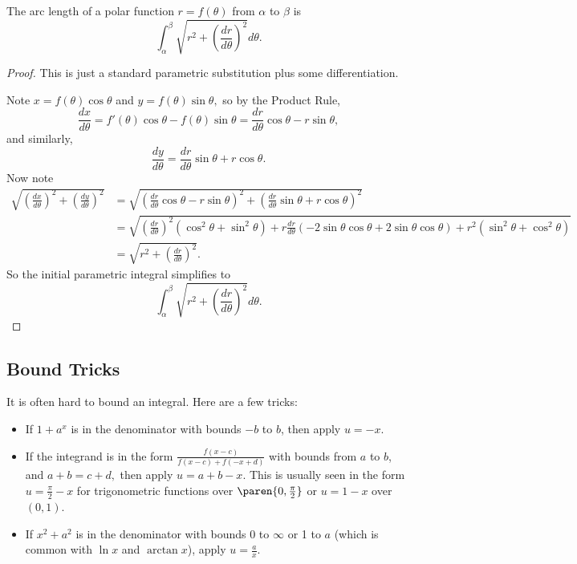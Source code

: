\documentclass{article}
\begin{document}
\begin{theo}
The arc length of a polar function $r=f(\theta)$ from $\alpha$ to $\beta$ is
\[\int_{\alpha}^{\beta}\sqrt{r^2+\left(\frac{dr}{d\theta}\right)^2}d\theta.\]
\end{theo}

\begin{proof}
This is just a standard parametric substitution plus some differentiation.

Note $x=f(\theta)\cos\theta$ and $y=f(\theta)\sin\theta,$ so by the Product Rule,
\[\frac{dx}{d\theta}=f'(\theta)\cos\theta-f(\theta)\sin\theta=\frac{dr}{d\theta}\cos\theta-r\sin\theta,\]
and similarly,
\[\frac{dy}{d\theta}=\frac{dr}{d\theta}\sin\theta+r\cos\theta.\]
Now note
\begin{align*}
\sqrt{\left(\frac{dx}{d\theta}\right)^2+\left(\frac{dy}{d\theta}\right)^2}&=\sqrt{\left(\frac{dr}{d\theta}\cos\theta-r\sin\theta\right)^2+\left(\frac{dr}{d\theta}\sin\theta+r\cos\theta\right)^2} \\
&=\sqrt{\left(\frac{dr}{d\theta}\right)^2(\cos^2\theta+\sin^2\theta)+r\frac{dr}{d\theta}(-2\sin\theta\cos\theta+2\sin\theta\cos\theta)+r^2(\sin^2\theta+\cos^2\theta)} \\
&=\sqrt{r^2+\left(\frac{dr}{d\theta}\right)^2}.
\end{align*}
So the initial parametric integral simplifies to
\[\int_{\alpha}^{\beta}\sqrt{r^2+\left(\frac{dr}{d\theta}\right)^2}d\theta.\]
\end{proof}


\subsection{Bound Tricks}
It is often hard to bound an integral. Here are a few tricks:
\begin{itemize}
    \item If $1+a^x$ is in the denominator with bounds $-b$ to $b$, then apply $u=-x$.
    \item If the integrand is in the form $\frac{f(x-c)}{f(x-c)+f(-x+d)}$ with bounds from $a$ to $b$, and $a+b=c+d,$ then apply $u=a+b-x$. This is usually seen in the form $u=\frac{\pi}{2}-x$ for trigonometric functions over $\paren{0,\frac{\pi}{2}}$ or $u=1-x$ over $(0,1)$.
    \item If $x^2+a^2$ is in the denominator with bounds 0 to $\infty$ or 1 to $a$ (which is common with $\ln x$ and $\arctan x$), apply $u=\frac{a}{x}$.
\end{itemize}
\end{document}

